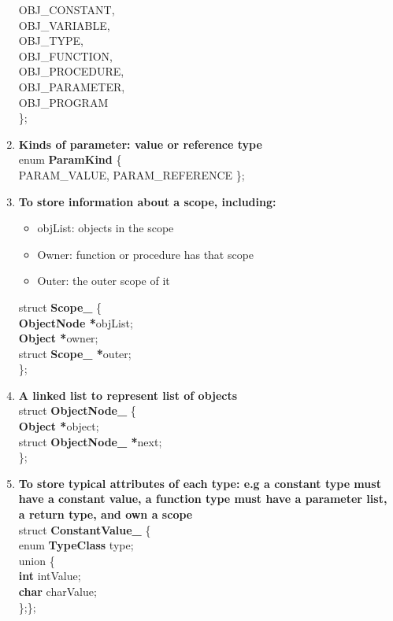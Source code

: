 \documentclass[12pt, a4paper]{report}
\begin{document}
\begin{enumerate}
  						OBJ\_CONSTANT,\\
  						OBJ\_VARIABLE,\\
  						OBJ\_TYPE,\\
  						OBJ\_FUNCTION,\\
  						OBJ\_PROCEDURE,\\
  						OBJ\_PARAMETER,\\
  						OBJ\_PROGRAM\\
						\};
						\item \textbf{Kinds of parameter: value or reference type}\\
						enum \textbf{ParamKind} \{\\
  						PARAM\_VALUE,
  						PARAM\_REFERENCE
						\};
						\item \textbf{To store information about a scope, including:}
						\begin{itemize}
							\item objList: objects in the scope
    						\item Owner: function or procedure has that scope
    						\item Outer: the outer scope of it
						\end{itemize}
						struct \textbf{Scope\_} \{\\
  						\textbf{ObjectNode *}objList;\\
  						\textbf{Object *}owner;\\
  						struct \textbf{Scope\_ *}outer;\\
						\};
						\item \textbf{A linked list to represent list of objects}\\
						struct \textbf{ObjectNode\_} \{\\
  						\textbf{Object *}object;\\
  						struct \textbf{ObjectNode\_ *}next;\\
						\};
						\item \textbf{To store typical attributes of each type: e.g a constant type must have a constant value, a function type must have a parameter list, a return type, and own a scope}\\
						struct \textbf{ConstantValue\_} \{\\
  						enum \textbf{TypeClass} type;\\
  						union \{\\
    					\textbf{int} intValue;\\
    					\textbf{char} charValue;\\
  						\};\};\\


\end{enumerate}
\end{document}
